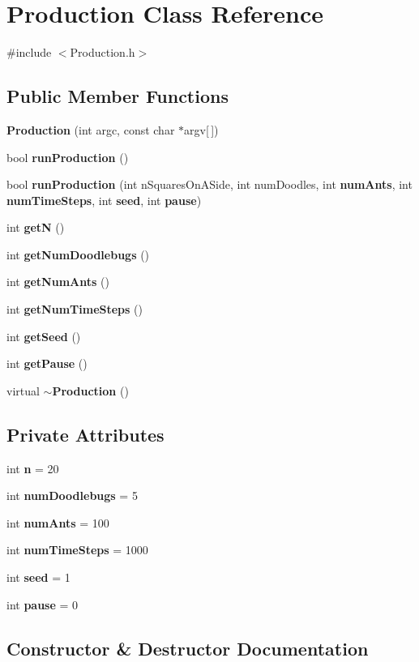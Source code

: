 \section{Production Class Reference}
\label{classProduction}


{\ttfamily \#include $<$Production.\+h$>$}

\subsection*{Public Member Functions}
\begin{DoxyCompactItemize}
\item 
\textbf{ Production} (int argc, const char $\ast$argv[$\,$])
\item 
bool \textbf{ run\+Production} ()
\item 
bool \textbf{ run\+Production} (int n\+Squares\+On\+A\+Side, int num\+Doodles, int \textbf{ num\+Ants}, int \textbf{ num\+Time\+Steps}, int \textbf{ seed}, int \textbf{ pause})
\item 
int \textbf{ getN} ()
\item 
int \textbf{ get\+Num\+Doodlebugs} ()
\item 
int \textbf{ get\+Num\+Ants} ()
\item 
int \textbf{ get\+Num\+Time\+Steps} ()
\item 
int \textbf{ get\+Seed} ()
\item 
int \textbf{ get\+Pause} ()
\item 
virtual \textbf{ $\sim$\+Production} ()
\end{DoxyCompactItemize}
\subsection*{Private Attributes}
\begin{DoxyCompactItemize}
\item 
int \textbf{ n} = 20
\item 
int \textbf{ num\+Doodlebugs} = 5
\item 
int \textbf{ num\+Ants} = 100
\item 
int \textbf{ num\+Time\+Steps} = 1000
\item 
int \textbf{ seed} = 1
\item 
int \textbf{ pause} = 0
\end{DoxyCompactItemize}


\subsection{Constructor \& Destructor Documentation}
\mbox{\label{classProduction_ad29a49906320fdd3730d6ef66f4f081a}} 
